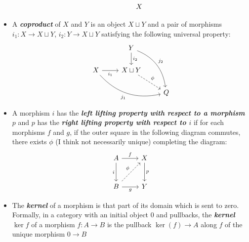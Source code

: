 \begin{defn}
\begin{itemize}
\[\begin{tikzcd}
			&X
		\end{tikzcd}\]
		\item A \textbf{\textit{coproduct}} of $X$ and $Y$ is an object $X\sqcup Y$ and a pair of morphisms $i_1:X\to X\sqcup Y$, $i_2:Y\to X\sqcup Y$ satisfying the following universal property:
		\[\begin{tikzcd}
			&Y\arrow[d,"i_2"]\arrow[ddr,bend left,"j_2"]\\
			X\arrow[r,"i_1",swap]\arrow[drr,bend right,swap,"j_1"]&X\sqcup Y\arrow[dr,dashed,"\phi"]\\
			&&Q
		\end{tikzcd}\]
		\item A morphism $i$ has the \textbf{\textit{left lifting property with respect to a morphism $p$}} and $p$ has the \textbf{\textit{right lifting property with respect to $i$}} if for each morphisms $f$ and $g$, if the outer square in the following diagram commutes, there exists $\phi$ (I think not necessarily unique) completing the diagram:
		\[\begin{tikzcd}[row sep=large]
			A\arrow[r,"f"]\arrow[d,"i",swap]&X\arrow[d,"p"]\\
			B\arrow[r,"g",swap]\arrow[ur,dashed,"\phi"]&Y
		\end{tikzcd}\]
		\item The \textbf{\textit{kernel}} of a morphism is that part of its domain which is sent to zero. Formally, in a category with an initial object 0 and pullbacks, the \textbf{\textit{kernel $\ker f$}} of a morphism $f:A\to B$ is the pullback $\ker(f)\to A$ along $f$ of the unique morphism $0\to B$
		

\end{itemize}
\end{defn}
